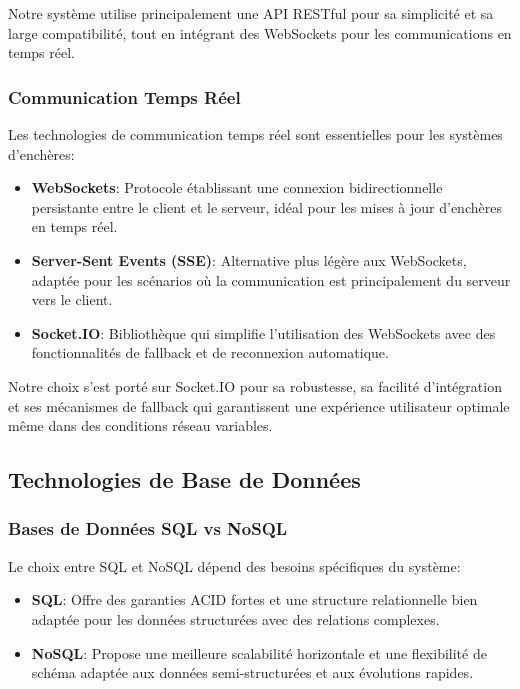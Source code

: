 Notre système utilise principalement une API RESTful pour sa simplicité et sa large compatibilité, tout en intégrant des WebSockets pour les communications en temps réel.

\subsubsection{Communication Temps Réel}

Les technologies de communication temps réel sont essentielles pour les systèmes d'enchères:

\begin{itemize}
    \item \textbf{WebSockets}: Protocole établissant une connexion bidirectionnelle persistante entre le client et le serveur, idéal pour les mises à jour d'enchères en temps réel.
    
    \item \textbf{Server-Sent Events (SSE)}: Alternative plus légère aux WebSockets, adaptée pour les scénarios où la communication est principalement du serveur vers le client.
    
    \item \textbf{Socket.IO}: Bibliothèque qui simplifie l'utilisation des WebSockets avec des fonctionnalités de fallback et de reconnexion automatique.
\end{itemize}

Notre choix s'est porté sur Socket.IO pour sa robustesse, sa facilité d'intégration et ses mécanismes de fallback qui garantissent une expérience utilisateur optimale même dans des conditions réseau variables.

\subsection{Technologies de Base de Données}

\subsubsection{Bases de Données SQL vs NoSQL}

Le choix entre SQL et NoSQL dépend des besoins spécifiques du système:

\begin{itemize}
    \item \textbf{SQL}: Offre des garanties ACID fortes et une structure relationnelle bien adaptée pour les données structurées avec des relations complexes.
    
    \item \textbf{NoSQL}: Propose une meilleure scalabilité horizontale et une flexibilité de schéma adaptée aux données semi-structurées et aux évolutions rapides.
\end{itemize}

